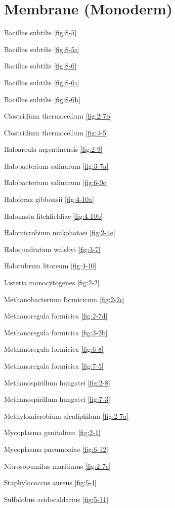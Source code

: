 \documentclass[]{tufte-book}
\begin{document}
\hypertarget{membrane-monoderm}{%
\section*{Membrane (Monoderm)}\label{membrane-monoderm}}

Bacillus subtilis \ref{fig:8-5}

Bacillus subtilis \ref{fig:8-5a}

Bacillus subtilis \ref{fig:8-6}

Bacillus subtilis \ref{fig:8-6a}

Bacillus subtilis \ref{fig:8-6b}

Clostridium thermocellum \ref{fig:2-7b}

Clostridium thermocellum \ref{fig:4-5}

Haloarcula argentinensis \ref{fig:2-9}

Halobacterium salinarum \ref{fig:3-7a}

Halobacterium salinarum \ref{fig:6-9c}

Haloferax gibbonsii \ref{fig:4-10a}

Halohasta litchfieldiae \ref{fig:4-10b}

Halomicrobium mukohataei \ref{fig:2-4e}

Haloquadratum walsbyi \ref{fig:3-7}

Halorubrum litoreum \ref{fig:4-10}

Listeria monocytogenes \ref{fig:2-2}

Methanobacterium formicicum \ref{fig:2-2c}

Methanoregula formicica \ref{fig:2-7d}

Methanoregula formicica \ref{fig:3-2b}

Methanoregula formicica \ref{fig:6-8}

Methanoregula formicica \ref{fig:7-5}

Methanospirillum hungatei \ref{fig:2-8}

Methanospirillum hungatei \ref{fig:7-3}

Methylomicrobium alcaliphilum \ref{fig:2-7a}

Mycoplasma genitalium \ref{fig:2-1}

Mycoplasma pneumoniae \ref{fig:6-12}

Nitrosopumilus maritimus \ref{fig:2-7c}

Staphylococcus aureus \ref{fig:5-4}

Sulfolobus acidocaldarius \ref{fig:5-11}
\end{document}
